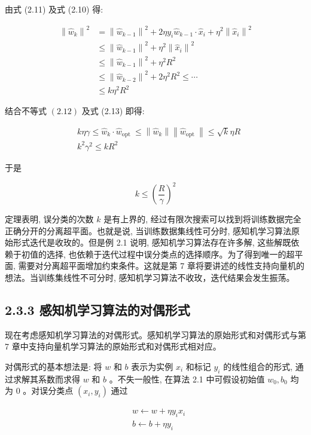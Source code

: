 \documentclass[10pt]{article}
\begin{document}
由式 (2.11) 及式 (2.10) 得:

$$
\begin{aligned}
\left\|\hat{w}_{k}\right\|^{2} & =\left\|\hat{w}_{k-1}\right\|^{2}+2 \eta y_{i} \hat{w}_{k-1} \cdot \hat{x}_{i}+\eta^{2}\left\|\hat{x}_{i}\right\|^{2} \\
& \leqslant\left\|\hat{w}_{k-1}\right\|^{2}+\eta^{2}\left\|\hat{x}_{i}\right\|^{2} \\
& \leqslant\left\|\hat{w}_{k-1}\right\|^{2}+\eta^{2} R^{2} \\
& \leqslant\left\|\hat{w}_{k-2}\right\|^{2}+2 \eta^{2} R^{2} \leqslant \cdots \\
& \leqslant k \eta^{2} R^{2}
\end{aligned}
$$

结合不等式 $(2.12)$ 及式 (2.13) 即得:

$$
\begin{aligned}
& k \eta \gamma \leqslant \hat{w}_{k} \cdot \hat{w}_{\text {opt }} \leqslant\left\|\hat{w}_{k}\right\|\left\|\hat{w}_{\text {opt }}\right\| \leqslant \sqrt{k} \eta R \\
& k^{2} \gamma^{2} \leqslant k R^{2}
\end{aligned}
$$

于是

$$
k \leqslant\left(\frac{R}{\gamma}\right)^{2}
$$

定理表明, 误分类的次数 $k$ 是有上界的, 经过有限次搜索可以找到将训练数据完全正确分开的分离超平面。也就是说, 当训练数据集线性可分时, 感知机学习算法原始形式迭代是收玫的。但是例 2.1 说明, 感知机学习算法存在许多解, 这些解既依赖于初值的选择, 也依赖于迭代过程中误分类点的选择顺序。为了得到唯一的超平面, 需要对分离超平面增加约束条件。这就是第 7 章将要讲述的线性支持向量机的想法。当训练集线性不可分时, 感知机学习算法不收玫，迭代结果会发生振荡。

\subsection*{2.3.3 感知机学习算法的对偶形式}
现在考虑感知机学习算法的对偶形式。感知机学习算法的原始形式和对偶形式与第 7 章中支持向量机学习算法的原始形式和对偶形式相对应。

对偶形式的基本想法是: 将 $w$ 和 $b$ 表示为实例 $x_{i}$ 和标记 $y_{i}$ 的线性组合的形式, 通过求解其系数而求得 $w$ 和 $b$ 。不失一般性, 在算法 2.1 中可假设初始值 $w_{0}, b_{0}$ 均为 0 。对误分类点 $\left(x_{i}, y_{i}\right)$ 通过

$$
\begin{aligned}
& w \leftarrow w+\eta y_{i} x_{i} \\
& b \leftarrow b+\eta y_{i}
\end{aligned}
$$
\end{document}
